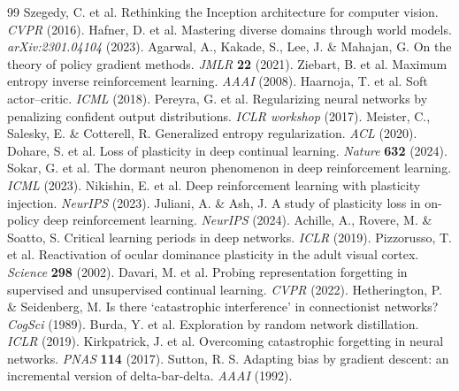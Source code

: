 \documentclass[sn-nature]{sn-jnl}
\begin{document}
\begin{thebibliography}{99}
 Szegedy, C. et al. Rethinking the Inception
architecture for computer vision. \emph{CVPR} (2016).
 Hafner, D. et al. Mastering diverse domains
through world models. \emph{arXiv:2301.04104} (2023).
 Agarwal, A., Kakade, S., Lee, J. \& Mahajan, G.
On the theory of policy gradient methods. \emph{JMLR} \textbf{22} (2021).
 Ziebart, B. et al. Maximum entropy inverse
reinforcement learning. \emph{AAAI} (2008).
 Haarnoja, T. et al. Soft actor--critic.
\emph{ICML} (2018).
 Pereyra, G. et al. Regularizing neural networks by
penalizing confident output distributions. \emph{ICLR workshop} (2017).
 Meister, C., Salesky, E. \& Cotterell, R.
Generalized entropy regularization. \emph{ACL} (2020).
 Dohare, S. et al. Loss of plasticity in deep
continual learning. \emph{Nature} \textbf{632} (2024).
 Sokar, G. et al. The dormant neuron phenomenon in
deep reinforcement learning. \emph{ICML} (2023).
 Nikishin, E. et al. Deep reinforcement learning
with plasticity injection. \emph{NeurIPS} (2023).
 Juliani, A. \& Ash, J. A study of plasticity loss
in on-policy deep reinforcement learning. \emph{NeurIPS} (2024).
 Achille, A., Rovere, M. \& Soatto, S. Critical
learning periods in deep networks. \emph{ICLR} (2019).
 Pizzorusso, T. et al. Reactivation of ocular
dominance plasticity in the adult visual cortex. \emph{Science}
\textbf{298} (2002).
 Davari, M. et al. Probing representation forgetting
in supervised and unsupervised continual learning. \emph{CVPR} (2022).
 Hetherington, P. \& Seidenberg, M. Is there
`catastrophic interference' in connectionist networks? \emph{CogSci}
(1989).
 Burda, Y. et al. Exploration by random network
distillation. \emph{ICLR} (2019).
 Kirkpatrick, J. et al. Overcoming catastrophic
forgetting in neural networks. \emph{PNAS} \textbf{114} (2017).
 Sutton, R. S. Adapting bias by gradient descent: an
incremental version of delta-bar-delta. \emph{AAAI} (1992).
\end{thebibliography}
\end{document}
